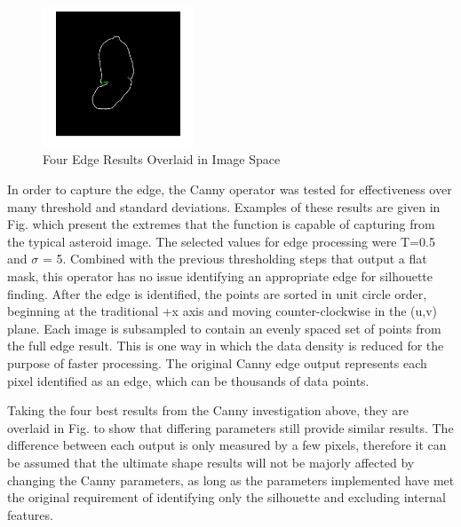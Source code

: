 \begin{figure}
    \centering
    \captionsetup{justification=centering}
    \includegraphics[width = 0.4\textwidth]{fig/overlay_canny_correctparameters.png}
    \caption{Four Edge Results Overlaid in Image Space}
    \label{fig:overlay}
\end{figure}
In order to capture the edge, the Canny operator was tested for effectiveness over many threshold and standard deviations. Examples of these results are given in Fig. %
which present the extremes that the function is capable of capturing from the typical asteroid image. The selected values for edge processing were T=0.5 and $\sigma$ = 5. Combined with the previous thresholding steps that output a flat mask, this operator has no issue identifying an appropriate edge for silhouette finding. After the edge is identified, the points are sorted in unit circle order, beginning at the traditional +x axis and moving counter-clockwise in the (u,v) plane. Each image is subsampled to contain an evenly spaced set of points from the full edge result. This is one way in which the data density is reduced for the purpose of faster processing. The original Canny edge output represents each pixel identified as an edge, which can be thousands of data points. 





Taking the four best results from the Canny investigation above, they are overlaid in Fig. %
to show that differing parameters still provide similar results. The difference between each output is only measured by a few pixels, therefore it can be assumed that the ultimate shape results will not be majorly affected by changing the Canny parameters, as long as the parameters implemented have met the original requirement of identifying only the silhouette and excluding internal features. 

